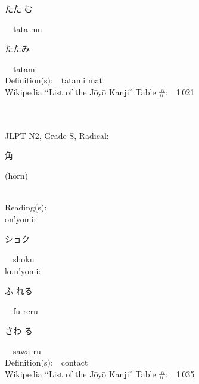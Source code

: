 \begin{multicols}{2}
{\hspace*{2em}}{\begin{CJK}{UTF8}{min} たた-む \end{CJK}}\ \ tata-mu\ \ \\
{\hspace*{2em}}{\begin{CJK}{UTF8}{min} たたみ \end{CJK}}\ \ tatami\ \ \\
Definition(s):\ \ tatami mat \\
Wikipedia ``List of the J\=oy\=o Kanji'' Table \#:\ \ 1\,021 \\
\ \ \\
{\fontsize{34pt}{40pt}  }\ \ \\  %
{JLPT N2, Grade S, Radical:\ \ {\begin{CJK}{UTF8}{min} 角 \end{CJK}} (horn) } \\
Reading(s):\ \ \\
{\hspace*{1em}}on'yomi:\ \ \\
{\hspace*{2em}}{\begin{CJK}{UTF8}{min} ショク \end{CJK}}\ \ shoku\ \ \\
{\hspace*{1em}}kun'yomi:\ \ \\
{\hspace*{2em}}{\begin{CJK}{UTF8}{min} ふ-れる \end{CJK}}\ \ fu-reru\ \ \\
{\hspace*{2em}}{\begin{CJK}{UTF8}{min} さわ-る \end{CJK}}\ \ sawa-ru\ \ \\
Definition(s):\ \ contact \\
Wikipedia ``List of the J\=oy\=o Kanji'' Table \#:\ \ 1\,035 \\
\ \ \\
{\fontsize{34pt}{40pt}  }\ \ \\  %

\end{multicols}

